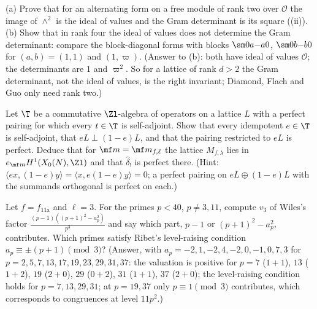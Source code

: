\begin{exercise}\label{ex:congruence:ex-alternating}
(a) Prove that for an alternating form on a free module of rank two over $\mathcal O$ the image of $\wedge^2$ is the ideal of values and the Gram determinant is its square ((ii)).
(b) Show that in rank four the ideal of values does not determine the Gram determinant: compare the block-diagonal forms with blocks $\sm0a{-a}0$, $\sm0b{-b}0$ for $(a,b)=(1,1)$ and $(1,\varpi)$.
(Answer to (b): both have ideal of values $\mathcal O$; the determinants are $1$ and $\varpi^2$. So for a lattice of rank $d>2$ the Gram determinant,
not the ideal of values, is the right invariant; Diamond, Flach and Guo only need rank two.)
\end{exercise}

\begin{exercise}\label{ex:congruence:ex-idempotent}
Let $\T$ be a commutative $\Zl$-algebra of operators on a lattice $L$ with a perfect pairing for which every $t\in\T$ is self-adjoint. Show that every idempotent $e\in\T$ is self-adjoint, that $eL\perp(1-e)L$,
and that the pairing restricted to $eL$ is perfect. Deduce that for $\mf m=\mf m_{f,\ell}$ the lattice $M_{f,\lambda}$ lies in $e_{\mf m}H^1(X_0(N),\Zl)$ and that $\hat\delta_!$ is perfect there. (Hint: $\langle ex,(1-e)y\rangle=\langle x,e(1-e)y\rangle=0$; a
perfect pairing on $eL\oplus(1-e)L$ with the summands orthogonal is perfect on each.)
\end{exercise}

\begin{exercise}\label{ex:congruence:ex-level-raising}
Let $f=f_{\text{11a}}$ and $\ell=3$. For the primes $p<40$, $p\ne3,11$, compute $v_3$ of Wiles's factor $\frac{(p-1)((p+1)^2-a_p^2)}{p^3}$ and say which part, $p-1$ or $(p+1)^2-a_p^2$, contributes. Which primes satisfy Ribet's
level-raising condition $a_p\equiv\pm(p+1)\pmod3$? (Answer, with $a_p=-2,1,-2,4,-2,0,-1,0,7,3$ for $p=2,5,7,13,17,19,23,29,31,37$: the valuation is positive for $p=7$ ($1+1$), $13$ ($1+2$), $19$ ($2+0$),
$29$ ($0+2$), $31$ ($1+1$), $37$ ($2+0$); the level-raising condition holds for $p=7,13,29,31$; at $p=19,37$ only $p\equiv1\pmod 3$ contributes, which corresponds to congruences at level $11p^2$.)
\end{exercise}

